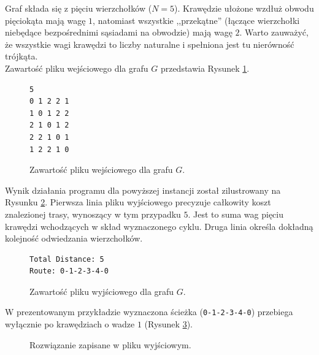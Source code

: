 \documentclass{article}
\theoremstyle{definition}
\theoremstyle{plain}
\theoremstyle{remark}
\begin{document}
\noindent
Graf składa się z pięciu wierzchołków ($N=5$). Krawędzie ułożone wzdłuż obwodu pięciokąta mają wagę $1$, natomiast wszystkie ,,przekątne'' (łączące wierzchołki niebędące bezpośrednimi sąsiadami na obwodzie) mają wagę $2$. Warto zauważyć, że wszystkie wagi krawędzi to liczby naturalne i spełniona jest tu nierówność trójkąta. \\

\noindent
Zawartość pliku wejściowego dla grafu $G$ przedstawia Rysunek \ref{lst:input}.

\begin{figure}[H]
\begin{verbatim}
5
0 1 2 2 1
1 0 1 2 2
2 1 0 1 2
2 2 1 0 1
1 2 2 1 0
\end{verbatim}
\caption{Zawartość pliku wejściowego dla grafu $G$.}
\label{lst:input}
\end{figure}

Wynik działania programu dla powyższej instancji został zilustrowany na Rysunku \ref{lst:output}. Pierwsza linia pliku wyjściowego precyzuje całkowity koszt znalezionej trasy, wynoszący w tym przypadku $5$. Jest to suma wag pięciu krawędzi wchodzących w skład wyznaczonego cyklu. Druga linia określa dokładną kolejność odwiedzania wierzchołków. 

\begin{figure}[H]
\begin{verbatim}
Total Distance: 5
Route: 0-1-2-3-4-0
\end{verbatim}
\caption{Zawartość pliku wyjściowego dla grafu $G$.}
\label{lst:output}
\end{figure}

\noindent
W prezentowanym przykładzie wyznaczona ścieżka (\texttt{0-1-2-3-4-0}) przebiega wyłącznie po krawędziach o wadze $1$ (Rysunek \ref{rys:optymalny}).

\begin{figure}[H]
    \centering
    \caption{Rozwiązanie zapisane w pliku wyjściowym.}
    \label{rys:optymalny}
\end{figure}
\end{document}
